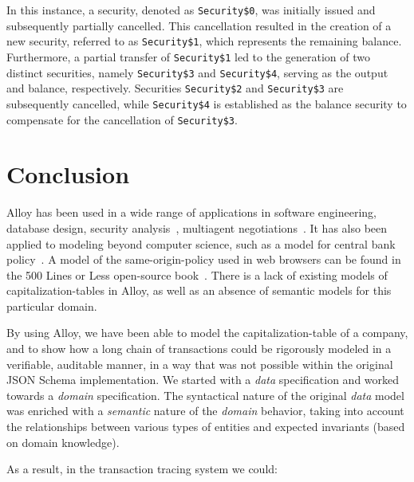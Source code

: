 In this instance, a security, denoted as \verb|Security$0|, was initially issued and subsequently partially cancelled. This cancellation resulted in the creation of a new security, referred to as \verb|Security$1|, which represents the remaining balance. Furthermore, a partial transfer of \verb|Security$1| led to the generation of two distinct securities, namely \verb|Security$3| and \verb|Security$4|, serving as the output and balance, respectively. Securities \verb|Security$2| and \verb|Security$3| are subsequently cancelled, while \verb|Security$4| is established as the balance \gls{security} to compensate for the cancellation of \verb|Security$3|.




\section{Conclusion}

Alloy has been used in a wide range of applications in software engineering, database design, \gls{security} analysis~\cite{Carpio2021}\cite{Chen2006}, multiagent negotiations~\cite{Podorozhny}. It has also been applied to modeling beyond computer science, such as a model for central bank policy~\cite{Johnson2021}. A model of the same-origin-policy used in web browsers can be found in the 500 Lines or Less open-source book~\cite{500Lines19:online}.
%
There is a lack of existing models of \glspl{capitalization-table} in Alloy, as well as an absence of semantic models for this particular domain.

By using Alloy, we have been able to model the \gls{capitalization-table} of a company, and to show how a long chain of \glspl{transaction} could be rigorously modeled in a verifiable, auditable manner, in a way that was not possible within the original JSON Schema implementation.
%
We started with a \textit{data} specification and worked towards a \textit{domain} specification. The syntactical nature of the original \textit{data} model was enriched with a \textit{semantic} nature of the \textit{domain} behavior, taking into account the relationships between various types of entities and expected invariants (based on domain knowledge).

As a result, in the transaction tracing system we could:

